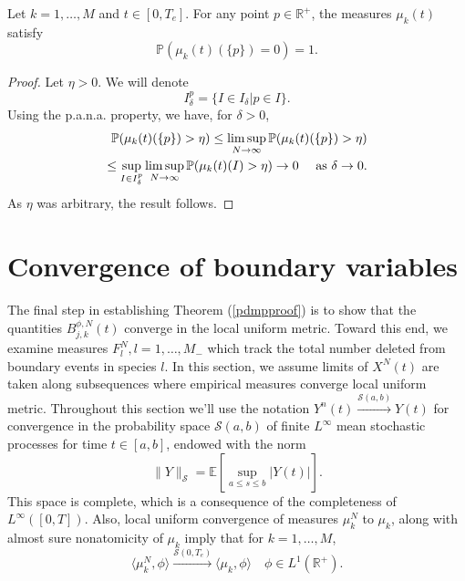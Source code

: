 \begin{theorem} Let  $k = 1, \dots, M$ and $t \in [0,T_e]$.
For any point $p \in \mathbb{R}^+$, the measures $\mu_k(t)$ satisfy
\begin{equation}
\mathbb P(\mu_k(t)(\{p\}) = 0) = 1. 
\end{equation}
\end{theorem}
\begin{proof}
Let $\eta>0$.  We will denote
\begin{equation}
I_\delta^p = \{I \in I_\delta | p \in I\}.
\end{equation}
Using the p.a.n.a. property, we have, for $\delta>0$, 
\begin{eqnarray}
\mathbb{P}(\mu_k(t)(\{p\}) > \eta)\le \limsup_{N\rightarrow \infty} \mathbb{P}(\mu_k(t)(\{p\})>\eta)\\
\le \sup_{I \in I_\delta^p}\limsup_{N\rightarrow \infty} \mathbb{P}(\mu_k(t)(I) > \eta)\rightarrow 0 \quad \hbox{ as } \delta \rightarrow 0. \nonumber
\end{eqnarray}
As $\eta$ was arbitrary, the result follows.
\end{proof}

\section{Convergence of boundary variables}\label{bounddim}

The final step in establishing Theorem (\ref{pdmpproof}) is to show  that the quantities $B_{j,k}^{\phi,N}(t)$ converge in the local uniform metric. Toward this end, we examine measures $F_l^N, l = 1, \dots, M_-$ which track the total number deleted from boundary events in species $l$. In this section, we assume limits of $X^N(t)$ are taken along subsequences where empirical measures converge local uniform metric.  Throughout this section we'll use the notation $Y^n(t) \xrightarrow{\mathcal S(a,b)} Y(t)$ for convergence in the probability space $\mathcal S(a,b)$ of finite $L^\infty$ mean stochastic  processes for time $t \in [a,b]$,   endowed with the norm 
\begin{equation}\label{lumetric}
\|Y\|_\mathcal S= \mathbb{E}\left[\sup_{a\le s\le b} |Y(t)|\right].  
\end{equation}
This space is complete, which is a consequence of the completeness of $L^\infty([0,T])$. Also, local uniform convergence of measures $\mu_k^N$ to $\mu_k$, along with almost sure nonatomicity of $\mu_k$ imply that for $k = 1, \dots, M$,
\begin{equation}\label{sconv}
\langle \mu_k^N, \phi \rangle \xrightarrow{\mathcal S(0,T_e)}\langle \mu_k, \phi\rangle \quad \phi \in L^1(\mathbb{R}^+).
\end{equation}

